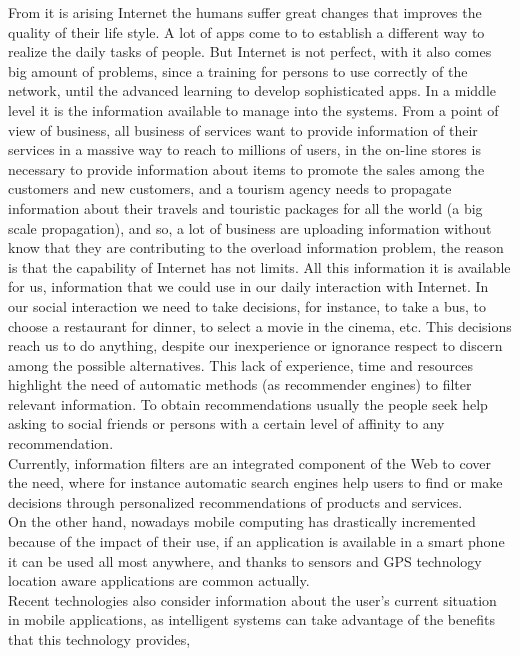 From it is arising Internet the humans suffer great changes
that improves the quality of their life style. A lot of apps come to 
to establish a different way to realize the daily tasks of people.
But Internet is not perfect, with it also comes big amount of problems, 
since a training for persons to use correctly of the network, until the
advanced learning to develop sophisticated apps. In a middle level
it is the information available to manage into the systems. 
From a point of view of business, all business of services want 
to provide information of their services in a massive way to reach
to millions of users, 
in the on-line stores is necessary to provide information about 
items to promote the sales among the customers 
and new customers, and a tourism agency needs to propagate
information about their travels and touristic packages for all
the world (a big scale propagation), and so, a lot of 
business are uploading 
information without know that they are contributing to 
the overload information problem, 
the reason is that the capability of Internet has not limits.
All this information it is available for us, information that 
we could use in our daily interaction with Internet.
In our social interaction we need to take decisions, 
for instance, to take a bus, to choose a restaurant for dinner,
to select a movie in the cinema, etc. This decisions reach us to 
do anything,  despite our inexperience or ignorance respect to
discern among the possible alternatives.
This lack of experience, time and resources 
highlight the need of automatic methods (as recommender engines) 
to filter relevant information.
To obtain recommendations usually the people seek help 
asking to social friends or persons with a certain 
level of affinity to any recommendation.\\
Currently, information filters are
an integrated component of the Web to cover the need, 
where for instance
automatic search engines help users to find or make 
decisions through personalized recommendations
of products and services. \\ 
On the other hand, nowadays mobile computing has drastically 
incremented because of the impact of their use, if an application 
is available in a smart phone it can be used all most anywhere, 
and thanks to sensors and GPS technology location aware 
applications are common actually.\\ 
Recent technologies also consider information about the user's 
current situation in mobile applications, as intelligent systems 
can take advantage of the benefits that this technology provides, 
